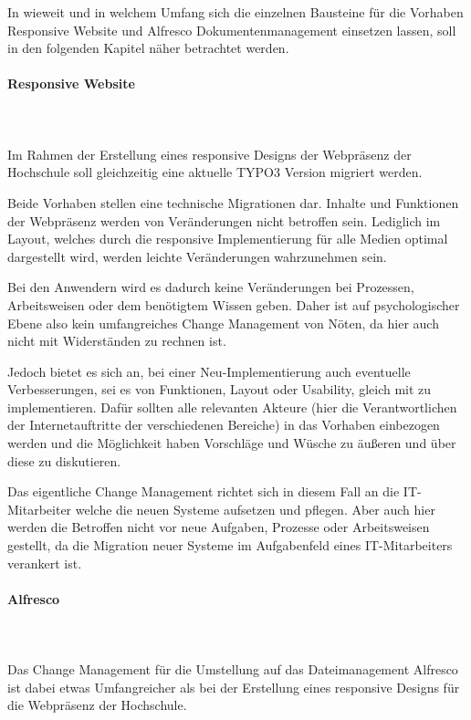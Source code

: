 In wieweit und in welchem Umfang sich die einzelnen Bausteine für die Vorhaben Responsive Website und Alfresco Dokumentenmanagement einsetzen lassen, soll in den folgenden Kapitel näher betrachtet werden.

\paragraph{Responsive Website}\mbox{}\\ \\
Im Rahmen der Erstellung eines responsive Designs der Webpräsenz der Hochschule soll gleichzeitig eine aktuelle TYPO3 Version migriert werden.

Beide Vorhaben stellen eine technische Migrationen dar. Inhalte und Funktionen  der Webpräsenz werden von Veränderungen nicht betroffen sein. Lediglich im Layout, welches durch die responsive Implementierung für alle Medien optimal dargestellt wird, werden leichte Veränderungen wahrzunehmen sein.

Bei den Anwendern wird es dadurch keine Veränderungen bei Prozessen, Arbeitsweisen oder dem benötigtem Wissen geben. Daher ist auf psychologischer Ebene also kein umfangreiches Change Management von Nöten, da hier auch nicht mit Widerständen zu rechnen ist.

Jedoch bietet es sich an, bei einer Neu-Implementierung auch eventuelle Verbesserungen, sei es von Funktionen, Layout oder Usability, gleich mit zu implementieren. Dafür sollten alle relevanten Akteure (hier die Verantwortlichen der Internetauftritte der verschiedenen Bereiche) in das Vorhaben einbezogen werden und die Möglichkeit haben Vorschläge und Wüsche zu äußeren und über diese zu diskutieren.

Das eigentliche Change Management richtet sich in diesem Fall an die IT-Mitarbeiter welche die neuen Systeme aufsetzen und pflegen. Aber auch hier werden die Betroffen nicht vor neue Aufgaben, Prozesse oder Arbeitsweisen gestellt, da die Migration neuer Systeme im Aufgabenfeld eines IT-Mitarbeiters verankert ist.

\paragraph{Alfresco}\mbox{}\\ \\
Das Change Management für die Umstellung auf das Dateimanagement Alfresco ist dabei etwas Umfangreicher als bei der Erstellung eines responsive Designs für die Webpräsenz der Hochschule. 

